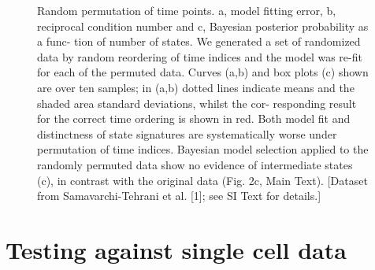 \begin{figure}
  \centering
  \caption{{\color{red} Random permutation of time points. a, model fitting error, b, reciprocal condition number and c, Bayesian posterior probability as a func- tion of number of states. We generated a set of randomized data by random reordering of time indices and the model was re-fit for each of the permuted data. Curves (a,b) and box plots (c) shown are over ten samples; in (a,b) dotted lines indicate means and the shaded area standard deviations, whilst the cor- responding result for the correct time ordering is shown in red. Both model fit and distinctness of state signatures are systematically worse under permutation of time indices. Bayesian model selection applied to the randomly permuted data show no evidence of intermediate states (c), in contrast with the original data (Fig. 2c, Main Text). [Dataset from Samavarchi-Tehrani et al. [1]; see SI Text for details.]}}
\label{fig:permutation-repro}
\end{figure}

\section{Testing against single cell data}
\label{sec:test-single-cell}

